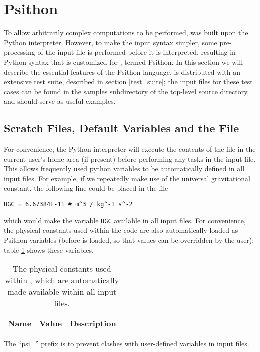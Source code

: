 \section{Psithon} \label{psithon}
 
To allow arbitrarily complex computations to be performed, \PSIfour was built
upon the Python interpreter. However, to make the input syntax simpler, some
pre-processing of the input file is performed before it is interpreted,
resulting in Python syntax that is customized for \PSI, termed Psithon.  In
this section we will describe the essential features of the Psithon language.
\PSIfour is distributed with an extensive test suite, described in section
\ref{test_suite}; the input files for these test cases can be found in the
samples subdirectory of the top-level \PSIfour source directory, and should
serve as useful examples.

\subsection{Scratch Files, Default Variables and the \psirc File} \label{sec:Psirc}
For convenience, the Python interpreter will execute the contents of the
\psirc file in the current user's home area (if present) before performing any
tasks in the input file.  This allows frequently used python variables to be
automatically defined in all input files.  For example, if we repeatedly make
use of the universal gravitational constant, the following line could be placed
in the \psirc file
\begin{verbatim}
UGC = 6.67384E-11 # m^3 / kg^-1 s^-2
\end{verbatim}
which would make the variable {\tt UGC} available in all \PSIfour input files.
For convenience, the physical constants used within the \PSIfour code are also
automatically loaded as Psithon variables (before \psirc is loaded, so that
\psirc values can be overridden by the user); table \ref{tab:physconst} shows
these variables.
\begin{table}[h!]
    \caption{The physical constants used within \PSIfour, which are automatically
             made available within all \PSIfour input files.}
    \label{tab:physconst}
    \setlength{\tabcolsep}{1pt}
    \small
    \begin{tabular}{lll}
        \hline
        \hline
        Name & Value & Description \\
        \hline
        
        \hline
        \hline
    \end{tabular}
\end{table}
The ``psi\_'' prefix is to prevent clashes with user-defined variables in
\PSIfour input files.

